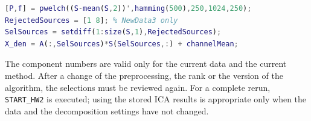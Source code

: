 \begin{lstlisting}[language=Matlab]
[P,f] = pwelch((S-mean(S,2))',hamming(500),250,1024,250);
RejectedSources = [1 8]; % NewData3 only
SelSources = setdiff(1:size(S,1),RejectedSources);
X_den = A(:,SelSources)*S(SelSources,:) + channelMean;
\end{lstlisting}

The component numbers are valid only for the current data and the current method. After a change of the preprocessing, the rank or the version of the algorithm, the selections must be reviewed again. For a complete rerun, \texttt{START\_HW2} is executed; using the stored ICA results is appropriate only when the data and the decomposition settings have not changed.

